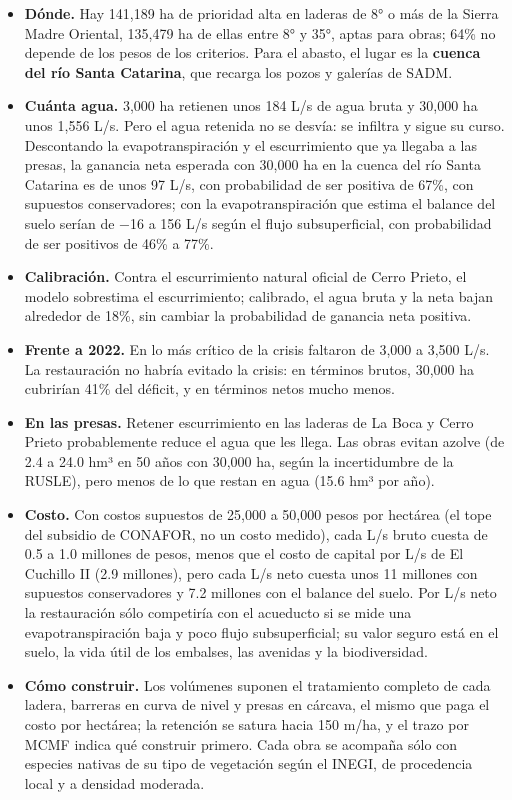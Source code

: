 \documentclass[11pt,letterpaper]{article}
\begin{document}
\begin{itemize}
  \item \textbf{Dónde.} Hay 141,189 ha de prioridad alta en laderas de 8° o más de la Sierra Madre Oriental, 135,479 ha de ellas entre 8° y 35°, aptas para obras; 64\% no depende de los pesos de los criterios. Para el abasto, el lugar es la \textbf{cuenca del río Santa Catarina}, que recarga los pozos y galerías de SADM.
  \item \textbf{Cuánta agua.} 3,000 ha retienen unos 184 L/s de agua bruta y 30,000 ha unos 1,556 L/s. Pero el agua retenida no se desvía: se infiltra y sigue su curso. Descontando la evapotranspiración y el escurrimiento que ya llegaba a las presas, la ganancia neta esperada con 30,000 ha en la cuenca del río Santa Catarina es de unos 97 L/s, con probabilidad de ser positiva de 67\%, con supuestos conservadores; con la evapotranspiración que estima el balance del suelo serían de −16 a 156 L/s según el flujo subsuperficial, con probabilidad de ser positivos de 46\% a 77\%.
  \item \textbf{Calibración.} Contra el escurrimiento natural oficial de Cerro Prieto, el modelo sobrestima el escurrimiento; calibrado, el agua bruta y la neta bajan alrededor de 18\%, sin cambiar la probabilidad de ganancia neta positiva.
  \item \textbf{Frente a 2022.} En lo más crítico de la crisis faltaron de 3,000 a 3,500 L/s. La restauración no habría evitado la crisis: en términos brutos, 30,000 ha cubrirían 41\% del déficit, y en términos netos mucho menos.
  \item \textbf{En las presas.} Retener escurrimiento en las laderas de La Boca y Cerro Prieto probablemente reduce el agua que les llega. Las obras evitan azolve (de 2.4 a 24.0 hm³ en 50 años con 30,000 ha, según la incertidumbre de la RUSLE), pero menos de lo que restan en agua (15.6 hm³ por año).
  \item \textbf{Costo.} Con costos supuestos de 25,000 a 50,000 pesos por hectárea (el tope del subsidio de CONAFOR, no un costo medido), cada L/s bruto cuesta de 0.5 a 1.0 millones de pesos, menos que el costo de capital por L/s de El Cuchillo II (2.9 millones), pero cada L/s neto cuesta unos 11 millones con supuestos conservadores y 7.2 millones con el balance del suelo. Por L/s neto la restauración sólo competiría con el acueducto si se mide una evapotranspiración baja y poco flujo subsuperficial; su valor seguro está en el suelo, la vida útil de los embalses, las avenidas y la biodiversidad.
  \item \textbf{Cómo construir.} Los volúmenes suponen el tratamiento completo de cada ladera, barreras en curva de nivel y presas en cárcava, el mismo que paga el costo por hectárea; la retención se satura hacia 150 m/ha, y el trazo por MCMF indica qué construir primero. Cada obra se acompaña sólo con especies nativas de su tipo de vegetación según el INEGI, de procedencia local y a densidad moderada.

\end{itemize}
\end{document}
